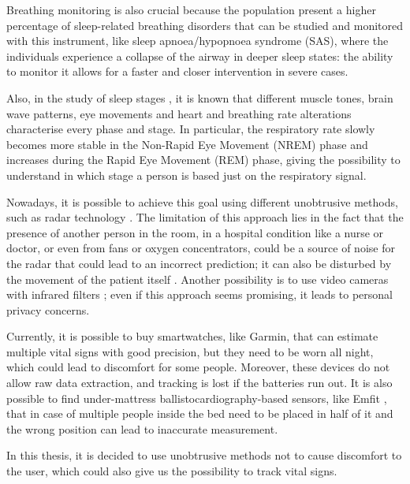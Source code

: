 Breathing monitoring is also crucial because the population present a higher percentage of 
sleep-related breathing disorders that can be studied and monitored with this instrument, like sleep apnoea/hypopnoea syndrome (SAS)\cite{SasPatients},  where the individuals experience a collapse of the airway in deeper sleep states: the ability to monitor it allows for a faster and closer intervention in severe cases. 

Also, in the study of sleep stages \cite{Gasmi2020SleepVariables}, it is known that different muscle tones, brain wave patterns, eye movements and heart and breathing rate alterations characterise every phase and stage.
In particular, the respiratory rate slowly becomes more stable in the Non-Rapid Eye Movement (NREM) phase and increases during the Rapid Eye Movement (REM) phase,
giving the possibility to understand in which stage a person is based just on the respiratory signal\cite{Pal2022BreathingWakefulness}.


Nowadays, it is possible to achieve this goal using different unobtrusive methods, such as radar technology \cite{RadarSensor}. The limitation of this approach lies in the fact that the presence of another person in the room, in a hospital condition like a nurse or doctor, or even from fans or oxygen concentrators, could be a source of noise for the radar that could lead to an incorrect prediction; it can also be disturbed by the movement of the patient itself \cite{LauteslagerValidation}. Another possibility is to use video cameras with infrared filters \cite{CamerasBasedVitalSigns}; even if this approach seems promising, it leads to personal privacy concerns. 

Currently, it is possible to buy smartwatches, like Garmin\cite{garminUrl}, that can estimate multiple vital signs with good precision\cite{GarminArticol}, but they need to be worn all night, which could lead to discomfort for some people.
Moreover, these devices do not allow raw data extraction, and tracking is lost if the batteries run out. It is also possible to find under-mattress ballistocardiography-based sensors\cite{Tenhunen2013EmfitBreathing}, like Emfit \cite{emfitUrl}, that in case of multiple people inside the bed need to be placed in half of it and the wrong position can lead to inaccurate measurement.

In this thesis, it is decided to use unobtrusive methods not to cause discomfort to the user, which could also give us the possibility to track vital signs. 

